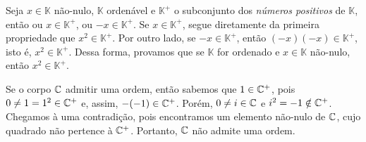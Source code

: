 \begin{questions}
\begin{solution}
Seja $x\in\mathbb{K}$ não-nulo, $\mathbb{K}$ ordenável e $\mathbb{K}^+$ o subconjunto dos \textit{números positivos} de $\mathbb{K}$, então ou $x\in\mathbb{K}^+$, ou $-x\in\mathbb{K}^+$.
%
Se $x\in\mathbb{K}^+$, segue diretamente da primeira propriedade que $x^2\in\mathbb{K}^+$.
%
Por outro lado, se $-x\in\mathbb{K}^+$, então $(-x)(-x)\in\mathbb{K}^+$, isto é, $x^2\in\mathbb{K}^+$.
%
Dessa forma, provamos que se $\mathbb{K}$ for ordenado e $x\in\mathbb{K}$ não-nulo, então $x^2\in\mathbb{K}^+$.

Se o corpo ${\mathbb C}$ admitir uma ordem, então sabemos que $1\in{\mathbb C}^+$, pois $0\neq 1 = 1^2\in{\mathbb C}^+$ e, assim, $-(-1) \in {\mathbb C}^+$.
%
Porém, $0\neq i\in{\mathbb C}$ e $i^2 = -1 \notin {\mathbb C}^+$. Chegamos à uma contradição, pois encontramos um elemento não-nulo de ${\mathbb C}$, cujo quadrado não pertence à ${\mathbb C}^+$. Portanto, ${\mathbb C}$ não admite uma ordem.
\end{solution}


\end{questions}
